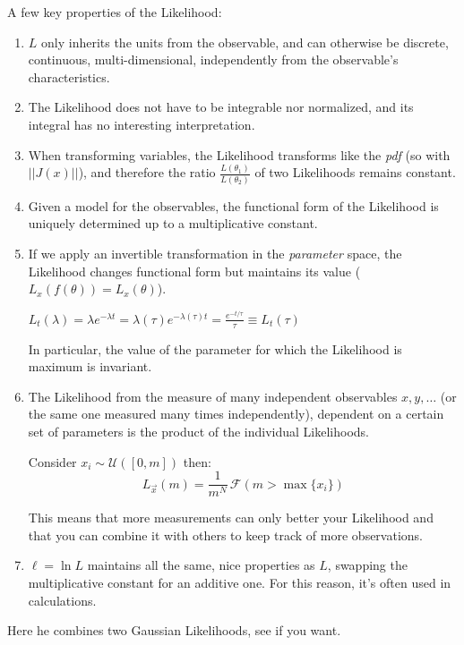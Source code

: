 A few key properties of the Likelihood:
\begin{enumerate}
	\item $L$ only inherits the units from the observable, and can otherwise be discrete, continuous, multi-dimensional, independently from the observable's characteristics.
	\item The Likelihood does not have to be integrable nor normalized, and its integral has no interesting interpretation.
	\item When transforming variables, the Likelihood transforms like the \emph{pdf} (so with $||J(x)||$), and therefore the ratio $\frac{L\left(\theta_1\right)}{L\left(\theta_2\right)}$ of two Likelihoods remains constant.
	\item Given a model for the observables, the functional form of the Likelihood is uniquely determined up to a multiplicative constant.
	\item If we apply an invertible transformation in the 	\emph{parameter} space, the Likelihood changes functional form but maintains its value ($L_x(f(\theta)) = L_x(\theta)$). 
	\begin{example}
		$L_{t}(\lambda)=\lambda e^{-\lambda t}=\lambda(\tau) e^{-\lambda(\tau) t}=\frac{e^{-t/\tau}}{\tau}\equiv L_{t}(\tau)$
	\end{example}
	In particular, the value of the parameter for which the Likelihood is maximum is invariant. 
	\item The Likelihood from the measure of many independent observables $x,y,\dots$ (or the same one measured many times independently), dependent on a certain set of parameters is the product of the individual Likelihoods. 
	\begin{example}
		Consider $x_i \sim \mathcal{U}([0,m])$ then:
		\[
		L_{\vec{x}}(m)=\frac{1}{m^N}\,\mathscr{F}(m>\max\{x_i\})
		\]
	\end{example}
	This means that more measurements can only better your Likelihood and that you can combine it with others to keep track of more observations. 
	\item $\ell =\ln{L}$ maintains all the same, nice properties as $L$, swapping the multiplicative constant for an additive one. For this reason, it's often used in calculations.
\end{enumerate}

\begin{example}
	Here he combines two Gaussian Likelihoods, see if you want.
\end{example}


